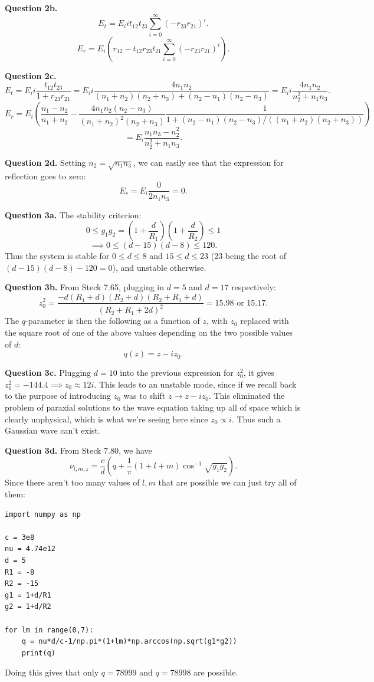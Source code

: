 \documentclass[letterpaper, reqno,11pt]{article}
\begin{document}
{\medskip\noindent\bf Question 2b.} 
\[
    E_t= E_iit_{12}t_{23}\sum_{i=0}^{\infty}\left(-r_{23}r_{21} \right)^{i} 
.\]
\[
    E_r = E_i \left( r_{12}-t_{12}r_{23}t_{21}\sum_{i=0}^{\infty}\left(-r_{23}r_{21}\right)^{i} \right) 
.\]

{\medskip\noindent\bf Question 2c.} 
\[
E_t = E_ii\frac{t_{12}t_{23}}{1+r_{23}r_{21} }= E_ii\frac{4n_1n_2}{(n_1+n_2)(n_2+n_3)+(n_2-n_1)(n_2-n_3)}=E_ii \frac{4n_1n_2}{n_2^2+n_1n_3}
.\]
\[
E_r = E_i \left(\frac{n_1-n_2}{n_1+n_2}-\frac{4n_1n_2(n_2-n_3)}{(n_1+n_2)^2(n_2+n_3)}\frac{1}{1+(n_2-n_1)(n_2-n_3)/\left( (n_1+n_2)(n_2+n_3) \right) } \right)
\]
\[
= E_i \frac{n_1n_3-n_2^2}{n_2^2+n_1n_3}
.\]

{\medskip\noindent\bf Question 2d.} Setting $n_2=\sqrt{n_1n_3}$, we can easily see that the expression for reflection goes to zero:
\[
E_r=E_i \frac{0}{2n_1n_3}=0
.\]

{\medskip\noindent\bf Question 3a.} The stability criterion:
\[
0\leq g_1g_2= \left( 1+\frac{d}{R_1} \right) \left( 1+\frac{d}{R_2} \right) \leq 1
\]
\[
\implies 0\leq (d-15)(d-8)\leq 120
.\]
Thus the system is stable for $0\leq d\leq 8$ and $15\leq d\leq 23$ ($23$ being the root of $(d-15)(d-8)-120=0$), and unstable otherwise.

{\medskip\noindent\bf Question 3b.} From Steck 7.65, plugging in $d=5$ and $d=17$ respectively:
\[
z_0^2= \frac{-d(R_1+d)(R_2+d)(R_2+R_1+d)}{\left( R_2+R_1+2d \right) ^2}= 15.98 \text{ or }15.17
.\]
The $q$-parameter is then the following as a function of $z$, with $z_0$ replaced with the square root of one of the above values depending on the two possible values of $d$:
\[
q(z)=z-iz_0
.\]

{\medskip\noindent\bf Question 3c.} Plugging $d=10$ into the previous expression for $z_0^2$, it gives $z_0^2=-144.4\implies z_0\approx 12i$. This leads to an unstable mode, since if we recall back to the purpose of introducing $z_0$ was to shift $z\rightarrow z-iz_0$. This eliminated the problem of paraxial solutions to the wave equation taking up all of space which is clearly unphysical, which is what we're seeing here since $z_0\propto i$. Thus such a Gaussian wave can't exist.

{\medskip\noindent\bf Question 3d.} From Steck 7.80, we have
\[
\nu_{l,m,z}=\frac{c}{d}\left(q+\frac{1}{\pi}\left( 1+l+m \right) \cos^{-1}\sqrt{g_1g_2}\right)
.\]
Since there aren't too many values of $l,m$ that are possible we can just try all of them:
\begin{lstlisting}
import numpy as np

c = 3e8
nu = 4.74e12
d = 5
R1 = -8
R2 = -15
g1 = 1+d/R1
g2 = 1+d/R2

for lm in range(0,7):
    q = nu*d/c-1/np.pi*(1+lm)*np.arccos(np.sqrt(g1*g2))
    print(q)
\end{lstlisting}
Doing this gives that only $q=78999$ and $q=78998$ are possible.
\end{document}
